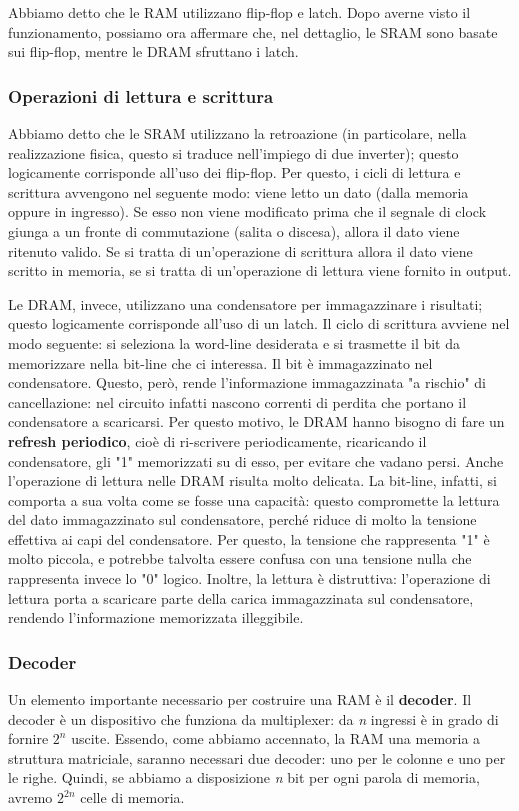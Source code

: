 \documentclass[\main/main.tex]{subfiles}
\begin{document}
Abbiamo detto che le RAM utilizzano flip-flop e latch. Dopo averne visto il funzionamento, possiamo ora affermare che, nel dettaglio, le SRAM sono basate sui flip-flop, mentre le DRAM sfruttano i latch. 

\subsubsection{Operazioni di lettura e scrittura}
Abbiamo detto che le SRAM utilizzano la retroazione (in particolare, nella realizzazione fisica, questo si traduce nell'impiego di due inverter); questo logicamente corrisponde all'uso dei flip-flop. 
Per questo, i cicli di lettura e scrittura avvengono nel seguente modo: viene letto un dato (dalla memoria oppure in ingresso). Se esso non viene modificato prima che il segnale di clock giunga a un fronte di commutazione (salita o discesa), allora il dato viene ritenuto valido.
Se si tratta di un'operazione di scrittura allora il dato viene scritto in memoria, se si tratta di un'operazione di lettura viene fornito in output. 

Le DRAM, invece, utilizzano una condensatore per immagazzinare i risultati; questo logicamente corrisponde all'uso di un latch.
Il ciclo di scrittura avviene nel modo seguente: si seleziona la word-line desiderata e si trasmette il bit da memorizzare nella bit-line che ci interessa. Il bit è immagazzinato nel condensatore. 
Questo, però, rende l'informazione immagazzinata "a rischio" di cancellazione: nel circuito infatti nascono correnti di perdita che portano il condensatore a scaricarsi. Per questo motivo, le DRAM hanno bisogno di fare un \textbf{refresh periodico}, cioè di ri-scrivere periodicamente, ricaricando il condensatore, gli "1" memorizzati su di esso, per evitare che vadano persi. 
Anche l'operazione di lettura nelle DRAM risulta molto delicata. La bit-line, infatti, si comporta a sua volta come se fosse una capacità: questo compromette la lettura del dato immagazzinato sul condensatore, perché riduce di molto la tensione effettiva ai capi del condensatore. Per questo, la tensione che rappresenta "1" è molto piccola, e potrebbe talvolta essere confusa con una tensione nulla che rappresenta invece lo "0" logico. 
Inoltre, la lettura è distruttiva: l'operazione di lettura porta a scaricare parte della carica immagazzinata sul condensatore, rendendo l'informazione memorizzata illeggibile. 

\subsubsection{Decoder}
Un elemento importante necessario per costruire una RAM è il \textbf{decoder}.
Il decoder è un dispositivo che funziona da multiplexer: da \textit{n} ingressi è in grado di fornire $2^n$ uscite.
Essendo, come abbiamo accennato, la RAM una memoria a struttura matriciale, saranno necessari due decoder: uno per le colonne e uno per le righe. 
Quindi, se abbiamo a disposizione \textit{n} bit per ogni parola di memoria, avremo $2^{2n}$ celle di memoria.
\end{document}
